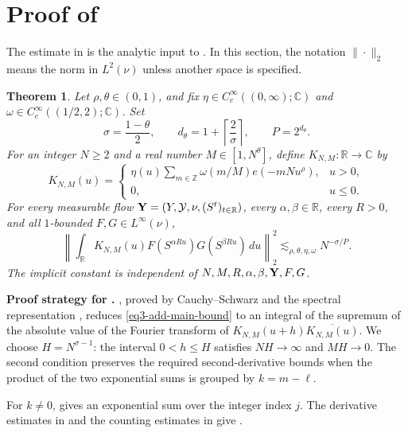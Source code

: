 \documentclass[reqno,12pt]{amsart}
\newtheorem{thm}{Theorem}[section]
\def \C {\mathbb C}
\def \Z {\mathbb Z}
\def \R {\mathbb R}
\def \Y {\mathcal{Y}}
\numberwithin{equation}{section}
\begin{document}
\section{Proof of \texorpdfstring{}{Theorem~}}\label{sec3:main}
The estimate in  is the analytic input to
. In this section, the notation $\|\cdot\|_2$ means the norm in $L^2(\nu)$ unless
another space is specified.
\begin{thm}\label{thm3-1}
Let $\rho,\theta\in(0,1)$, and fix
$\eta\in C_c^\infty((0,\infty);\C)$ and
$\omega\in C_c^\infty((1/2,2);\C)$. Set
\begin{equation}
 \sigma=\frac{1-\theta}{2},\qquad
 d_\theta=1+\left\lceil\frac2\sigma\right\rceil,
 \qquad P=2^{d_\theta}.
 \label{eq3-add-parameters}
\end{equation}
For an integer $N\ge2$ and a real number $M\in[1,N^\theta]$, define
$K_{N,M}:\R\to\C$ by
\begin{equation}
 K_{N,M}(u)=
 \begin{cases}
 \displaystyle\eta(u)\sum_{m\in\Z}\omega(m/M)e(-mNu^\rho),&u>0,\\[1mm]
 0,&u\le0.
 \end{cases}
 \label{eq3-add-kernel}
\end{equation}
For every measurable flow ${\bf Y}=(Y,\Y,\nu,(S^t)_{t\in\R})$,
every $\alpha,\beta\in\R$, every $R>0$, and all $1$-bounded
$F,G\in L^\infty(\nu)$,
\begin{equation}
 \left\|\int_\R K_{N,M}(u)
 F(S^{\alpha Ru})G(S^{\beta Ru})\,du\right\|_2^2
 \lesssim_{\rho,\theta,\eta,\omega}N^{-\sigma/P}.
 \label{eq3-add-main-bound}
\end{equation}
The implicit constant is independent of $N,M,R,\alpha,\beta,{\bf Y},F,G$.
\end{thm}

\noindent\textbf{Proof strategy for .}
, proved by Cauchy--Schwarz and the
spectral representation \cite[Theorem~4.45]{Folland2016}, reduces
\eqref{eq3-add-main-bound} to an integral of the supremum of the absolute value of the
Fourier transform of $K_{N,M}(u+h)\overline{K_{N,M}(u)}$.
We choose $H=N^{\sigma-1}$: the interval $0<h\le H$ satisfies
$NH\to\infty$ and $MH\to0$.
The second condition preserves the required second-derivative bounds
when the product of the two exponential sums is grouped by
$k=m-\ell$.

For $k\ne0$,  gives an exponential
sum over the integer index $j$. The derivative estimates in
 and the counting estimates in
 give .
\end{document}
